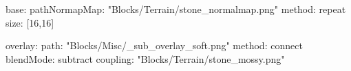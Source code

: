 base:
  pathNormapMap: "Blocks/Terrain/stone_normalmap.png"
  method: repeat
  size: [16,16]

overlay:
  path: "Blocks/Misc/_sub_overlay_soft.png"
  method: connect
  blendMode: subtract
  coupling: "Blocks/Terrain/stone_mossy.png"
